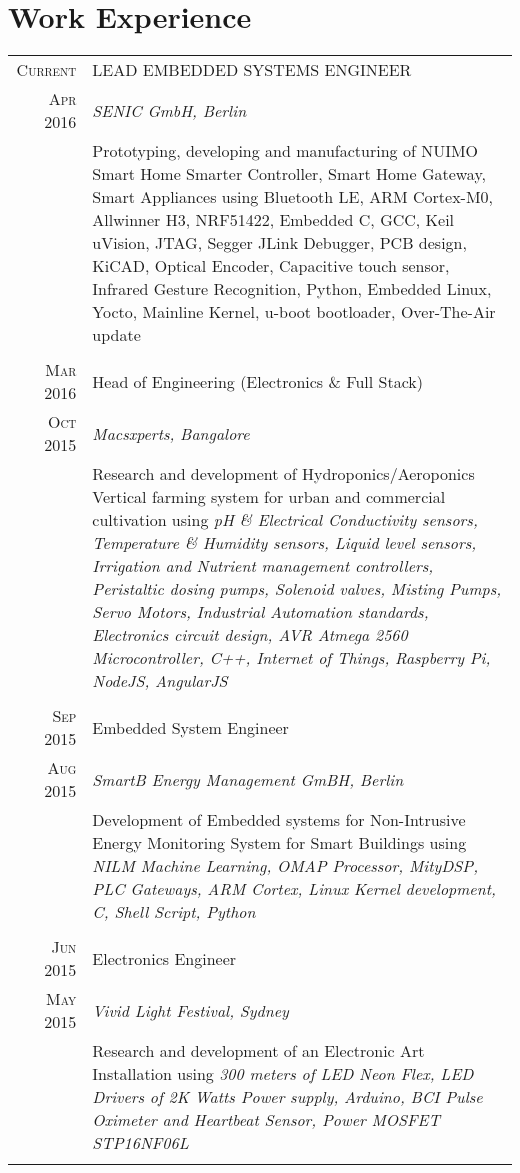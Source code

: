\section{Work Experience}
\begin{longtable}
	{r|p{12cm}}

	\textsc{Current} & LEAD EMBEDDED SYSTEMS ENGINEER\\
	\textsc{Apr 2016}&\emph{SENIC GmbH, Berlin}\\
	&\footnotesize{Prototyping, developing and manufacturing of NUIMO Smart Home Smarter Controller, Smart Home Gateway, Smart Appliances using Bluetooth LE, ARM Cortex-M0, Allwinner H3, NRF51422, Embedded C, GCC, Keil uVision, JTAG, Segger JLink Debugger,  PCB design, KiCAD, Optical Encoder, Capacitive touch sensor, Infrared Gesture Recognition, Python, Embedded Linux, Yocto, Mainline Kernel, u-boot bootloader, Over-The-Air update }\\	\multicolumn{2}{c}{} \\

	\textsc{Mar 2016} & Head of Engineering (Electronics \& Full Stack)\\
	\textsc{Oct 2015}&\emph{Macsxperts, Bangalore}\\
	&\footnotesize{Research and development of Hydroponics/Aeroponics Vertical farming system for urban and commercial cultivation using \emph{pH \& Electrical Conductivity sensors, Temperature \& Humidity sensors, Liquid level sensors, Irrigation and Nutrient management controllers, Peristaltic dosing pumps, Solenoid valves, Misting Pumps, Servo Motors, Industrial Automation standards,  Electronics circuit design, AVR Atmega 2560 Microcontroller, C++, Internet of Things, Raspberry Pi, NodeJS, AngularJS }}\\
	\multicolumn{2}{c}{} \\

	\textsc{Sep 2015} & Embedded System Engineer \\
	\textsc{Aug 2015}&\emph{SmartB Energy Management GmBH, Berlin}\\
	&\footnotesize{Development of Embedded systems for Non-Intrusive Energy Monitoring System for Smart Buildings using \emph{NILM Machine Learning, OMAP Processor, MityDSP, PLC Gateways, ARM Cortex, Linux Kernel development, C, Shell Script, Python}}\\
	\multicolumn{2}{c}{} \\

	\textsc{Jun 2015} & Electronics Engineer \\
	\textsc{May 2015}&\emph{Vivid Light Festival, Sydney}\\
	&\footnotesize{Research and development of an Electronic Art Installation using  \emph{300 meters of LED Neon Flex, LED Drivers of 2K Watts Power supply, Arduino, BCI Pulse Oximeter and Heartbeat Sensor, Power MOSFET STP16NF06L}}\\
	\multicolumn{2}{c}{} \\


\end{longtable}
